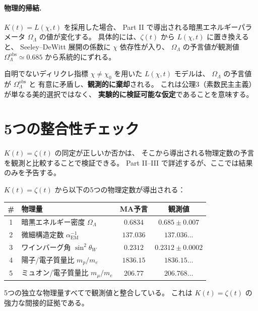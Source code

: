 \paragraph{物理的帰結.}
$K(t) = L(\chi, t)$ を採用した場合、
Part II で導出される暗黒エネルギーパラメータ $\Omega_\Lambda$ の値が変化する。
具体的には、$\zeta(t)$ から $L(\chi, t)$ に置き換えると、
Seeley--DeWitt 展開の係数に $\chi$ 依存性が入り、
$\Omega_\Lambda$ の予言値が観測値 $\Omega_\Lambda^{\mathrm{obs}} \simeq 0.685$
から系統的にずれる。

\begin{warningbox}[$w(p) \ne 1$ は観測で棄却される]
自明でないディリクレ指標 $\chi \ne \chi_0$ を用いた $L(\chi, t)$ モデルは、
$\Omega_\Lambda$ の予言値が $\Omega_\Lambda^{\mathrm{obs}}$ と
有意に矛盾し、\textbf{観測的に棄却}される。
これは公理3（素数民主主義）が単なる美的選択ではなく、
\textbf{実験的に検証可能な仮定}であることを意味する。
\end{warningbox}


\section{5つの整合性チェック}
\label{sec:five-checks}

$K(t) = \zeta(t)$ の同定が正しいか否かは、
そこから導出される物理定数の予言を観測と比較することで検証できる。
Part II--III で詳述するが、ここでは結果のみを予告する。

\begin{keyresult}[5つの物理定数]
$K(t) = \zeta(t)$ から以下の5つの物理定数が導出される：

\bigskip
\begin{center}
\renewcommand{\arraystretch}{1.3}
\begin{tabular}{clcc}
\toprule
\textbf{\#} & \textbf{物理量} & \textbf{MA予言} & \textbf{観測値} \\
\midrule
1 & 暗黒エネルギー密度 $\Omega_\Lambda$ & $0.6834$ & $0.685 \pm 0.007$ \\
2 & 微細構造定数 $\alpha_{\mathrm{EM}}^{-1}$ & $137.036$ & $137.036\ldots$ \\
3 & ワインバーグ角 $\sin^2\theta_W$ & $0.2312$ & $0.2312 \pm 0.0002$ \\
4 & 陽子/電子質量比 $m_p/m_e$ & $1836.15$ & $1836.15\ldots$ \\
5 & ミュオン/電子質量比 $m_\mu/m_e$ & $206.77$ & $206.768\ldots$ \\
\bottomrule
\end{tabular}
\end{center}

\medskip
\noindent
5つの独立な物理量すべてで観測値と整合している。
これは $K(t) = \zeta(t)$ の強力な間接的証拠である。
\end{keyresult}

